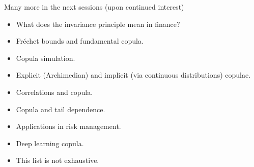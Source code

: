 \documentclass[envcountsect]{beamer}
\theoremstyle{definition}
\theoremstyle{plain}
\begin{document}
\begin{frame}{Many more in the next sessions (upon continued interest)}
	\begin{itemize}
		\item What does the invariance principle mean in finance?
		\item Fr\'echet bounds and fundamental copula.
		\item Copula simulation.
		\item Explicit (Archimedian) and implicit (via continuous distributions) copulae.
		\item Correlations and copula.
		\item Copula and tail dependence.
		\item Applications in risk management.
		\item Deep learning copula.
		\item This list is not exhaustive.
	\end{itemize}
\end{frame}
\end{document}
